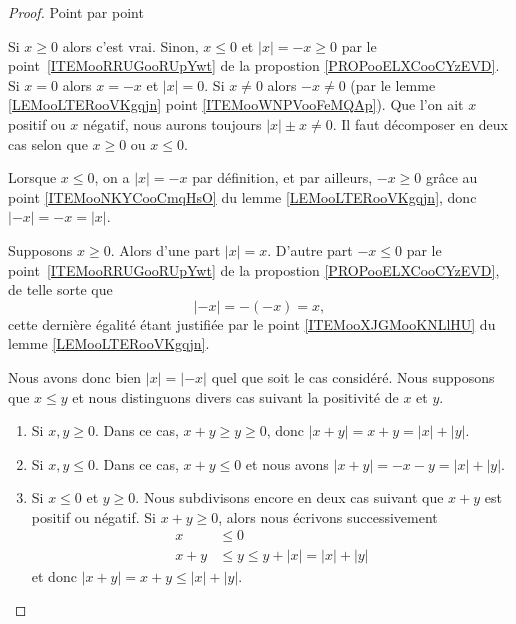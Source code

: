 \begin{proof}
	Point par point
	\begin{subproof}
		\spitem[\ref{ITEMooSDNHooDnjScE}]
		Si \( x\geq 0\) alors c'est vrai. Sinon, \( x\leq 0\) et \( | x |=-x\geq 0\) par le point~\ref{ITEMooRRUGooRUpYwt} de la propostion \ref{PROPooELXCooCYzEVD}.
		\spitem[\ref{ITEMooLQLTooTJTPVM}]
		Si \( x=0\) alors \( x=-x\) et \( | x |=0\).  Si \(x\neq 0\) alors \( -x\neq 0\) (par le lemme \ref{LEMooLTERooVKgqjn} point \ref{ITEMooWNPVooFeMQAp}).  Que l'on ait \( x\) positif ou \( x\) négatif, nous aurons toujours \( | x | \pm x\neq 0\).
		\spitem[\ref{ITEMooVJAEooOEatzY}]
		Il faut décomposer en deux cas selon que \( x\geq 0\) ou  \( x\leq 0\).

		Lorsque \( x\leq 0\), on a \( | x |= - x\) par définition, et par ailleurs, \( -x\geq 0\) grâce au point \ref{ITEMooNKYCooCmqHsO} du lemme \ref{LEMooLTERooVKgqjn}, donc \( | -x |= - x = | x |\).

		Supposons \( x\geq 0\). Alors d'une part \( | x |=x\). D'autre part \( -x\leq 0\) par le point~\ref{ITEMooRRUGooRUpYwt} de la propostion \ref{PROPooELXCooCYzEVD}, de telle sorte que
		\begin{equation}
			| -x |=-(-x)=x,
		\end{equation}
		cette dernière égalité étant justifiée par le point \ref{ITEMooXJGMooKNLlHU} du lemme \ref{LEMooLTERooVKgqjn}.

		Nous avons donc bien \( | x |=| -x |\) quel que soit le cas considéré.
		\spitem[\ref{ItemooOMKNooRlanvk}]
		Nous supposons que \( x\leq y\) et nous distinguons divers cas suivant la positivité de \( x\) et \( y\).
		\begin{enumerate}
			\item
			      Si \( x,y\geq 0\). Dans ce cas, \( x+y\geq y\geq 0\), donc \( | x+y |=x+y=| x |+| y |\).
			\item
			      Si \( x,y\leq 0\). Dans ce cas, \( x+y\leq 0\) et nous avons \( | x+y |=-x-y=| x |+| y |\).
			\item
			      Si \( x\leq 0\) et \( y\geq 0\). Nous subdivisons encore en deux cas suivant que \( x+y\) est positif ou négatif. Si \( x+y\geq 0\), alors nous écrivons successivement
			      \begin{subequations}
				      \begin{align}
					      x   & \leq 0                         \\
					      x+y & \leq y\leq y+| x |=| x |+| y |
				      \end{align}
			      \end{subequations}
			      et donc \( | x+y |=x+y\leq | x |+| y |\).


\end{enumerate}
\end{subproof}
\end{proof}
